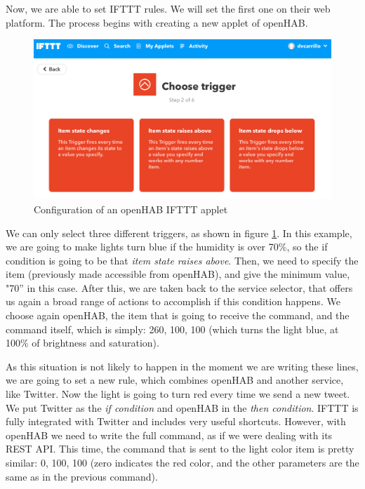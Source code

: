 Now, we are able to set IFTTT rules. We will set the first one on their web platform. The process begins with creating a new applet
of openHAB.

\begin{figure}
	\centering
	\includegraphics[width=1\textwidth]{images/Chapter_07/selection-iftt.png}
	\caption{Configuration of an openHAB IFTTT applet}
	\label{fig:selection-iftt}
\end{figure}

We can only select three different triggers, as shown in figure \ref{fig:selection-iftt}. In this example, we are going to make lights
turn blue if the humidity is over 70\%, so the if condition is going to be that \textit{item state raises above}. Then, we need to
specify the item (previously made accessible from openHAB), and give the minimum value, "70” in this case. After this, we are taken
back to the service selector, that offers us again a broad range of actions to accomplish if this condition happens. We choose again
openHAB, the item that is going to receive the command, and the command itself, which is simply: 260, 100, 100 (which turns the
light blue, at 100\% of brightness and saturation).

As this situation is not likely to happen in the moment we are writing these lines, we are going to set a new rule, which combines
openHAB and another service, like Twitter. Now the light is going to turn red every time we send a new tweet. We put Twitter as the
\textit{if condition} and openHAB in the \textit{then condition}. IFTTT is fully integrated with Twitter and includes very useful
shortcuts. However, with openHAB we need to write the full command, as if we were dealing with its REST API. This time, the command
that is sent to the light color item is pretty similar: 0, 100, 100 (zero indicates the red color, and the other parameters are the
same as in the previous command).

